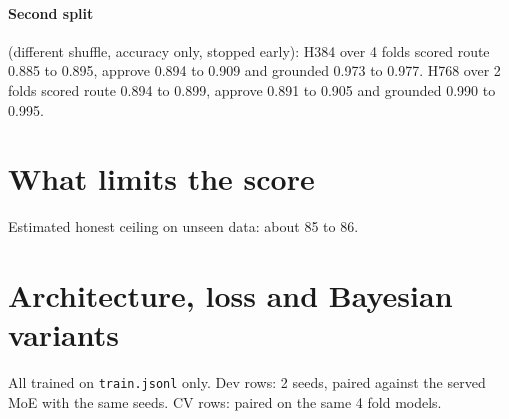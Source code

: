 \documentclass[10pt,a4paper]{article}
\begin{document}
\paragraph{Second split} (different shuffle, accuracy only, stopped early):
H384 over 4 folds scored route 0.885 to 0.895, approve 0.894 to 0.909 and grounded 0.973 to
0.977. H768 over 2 folds scored route 0.894 to 0.899, approve 0.891 to 0.905 and grounded
0.990 to 0.995.

\section{What limits the score}

\medskip
\noindent Estimated honest ceiling on unseen data: about 85 to 86.

\section{Architecture, loss and Bayesian variants}
All trained on \texttt{train.jsonl} only. Dev rows: 2 seeds, paired against the served MoE
with the same seeds. CV rows: paired on the same 4 fold models.
\end{document}
